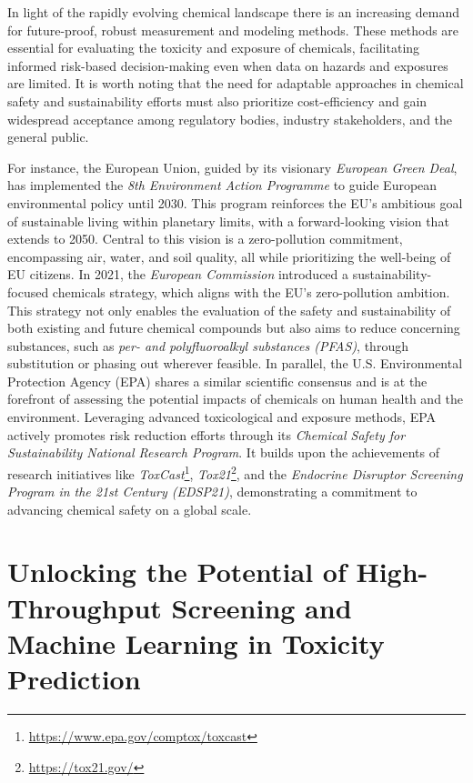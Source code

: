 In light of the rapidly evolving chemical landscape there is an increasing demand for future-proof, robust measurement and modeling methods. These methods are essential for evaluating the toxicity and exposure of chemicals, facilitating  informed risk-based decision-making even when data on hazards and exposures are limited. It is worth noting that the need for adaptable approaches in chemical safety and sustainability efforts must also prioritize cost-efficiency and gain widespread acceptance among regulatory bodies, industry stakeholders, and the general public.

For instance, the European Union, guided by its visionary \emph{European Green Deal}\cite{greendeal}, has implemented the \emph{8th Environment Action Programme} to guide European environmental policy until 2030. This program reinforces the EU's ambitious goal of sustainable living within planetary limits, with a forward-looking vision that extends to 2050. Central to this vision is a zero-pollution commitment, encompassing air, water, and soil quality, all while prioritizing the well-being of EU citizens. In 2021, the \emph{European Commission} introduced a sustainability-focused chemicals strategy\cite{EUChemicalsStrategy}, which aligns with the EU's zero-pollution ambition. This strategy not only enables the evaluation of the safety and sustainability of both existing and future chemical compounds but also aims to reduce concerning substances, such as \emph{per- and polyfluoroalkyl substances (PFAS)}, through substitution or phasing out wherever feasible. In parallel, the U.S. Environmental Protection Agency (EPA) shares a similar scientific consensus and is at the forefront of assessing the potential impacts of chemicals on human health and the environment. Leveraging advanced toxicological and exposure methods, EPA actively promotes risk reduction efforts through its \emph{Chemical Safety for Sustainability National Research Program}. It builds upon the achievements of research initiatives like \emph{ToxCast}\footnote{\url{https://www.epa.gov/comptox/toxcast}}, \emph{Tox21}\footnote{\url{https://tox21.gov/}}, and the \emph{Endocrine Disruptor Screening Program in the 21st Century (EDSP21)}, demonstrating a commitment to advancing chemical safety on a global scale.

\section{Unlocking the Potential of High-Throughput Screening and Machine Learning in Toxicity Prediction}

